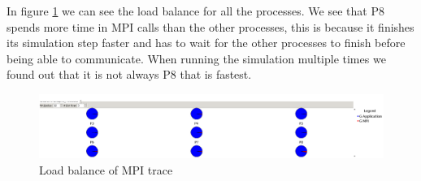 \documentclass[a4paper, 12pt]{article}
\begin{document}
In figure \ref{fig:mpiload} we can see the load balance for all the processes.
We see that P8 spends more time in MPI calls than the other processes, this is
because it finishes its simulation step faster and has to wait for the other
processes to finish before being able to communicate. When running the
simulation multiple times we found out that it is not always P8 that is fastest.
\begin{figure}[h]
        \centering
        \includegraphics[width=\textwidth]{load_balance.png}
        \caption{Load balance of MPI trace}
        \label{fig:mpiload}
\end{figure}
\end{document}
